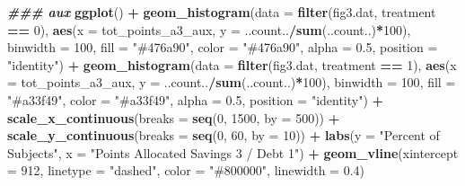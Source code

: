 \documentclass[
]{article}
\newenvironment{Shaded}{\begin{snugshade}}{\end{snugshade}}
\newcommand{\AttributeTok}[1]{\textcolor[rgb]{0.13,0.29,0.53}{#1}}
\newcommand{\DecValTok}[1]{\textcolor[rgb]{0.00,0.00,0.81}{#1}}
\newcommand{\DocumentationTok}[1]{\textcolor[rgb]{0.56,0.35,0.01}{\textbf{\textit{#1}}}}
\newcommand{\FloatTok}[1]{\textcolor[rgb]{0.00,0.00,0.81}{#1}}
\newcommand{\FunctionTok}[1]{\textcolor[rgb]{0.13,0.29,0.53}{\textbf{#1}}}
\newcommand{\NormalTok}[1]{#1}
\newcommand{\SpecialCharTok}[1]{\textcolor[rgb]{0.81,0.36,0.00}{\textbf{#1}}}
\newcommand{\StringTok}[1]{\textcolor[rgb]{0.31,0.60,0.02}{#1}}
\begin{document}
\begin{Shaded}
\begin{Highlighting}[]
\DocumentationTok{\#\#\# aux}
\FunctionTok{ggplot}\NormalTok{() }\SpecialCharTok{+}
  \FunctionTok{geom\_histogram}\NormalTok{(}\AttributeTok{data =} \FunctionTok{filter}\NormalTok{(fig3.dat, treatment }\SpecialCharTok{==} \DecValTok{0}\NormalTok{),}
                 \FunctionTok{aes}\NormalTok{(}\AttributeTok{x =}\NormalTok{ tot\_points\_a3\_aux, }\AttributeTok{y =}\NormalTok{ ..count..}\SpecialCharTok{/}\FunctionTok{sum}\NormalTok{(..count..)}\SpecialCharTok{*}\DecValTok{100}\NormalTok{),}
                 \AttributeTok{binwidth =} \DecValTok{100}\NormalTok{, }\AttributeTok{fill =} \StringTok{"\#476a90"}\NormalTok{, }\AttributeTok{color =} \StringTok{"\#476a90"}\NormalTok{, }\AttributeTok{alpha =} \FloatTok{0.5}\NormalTok{, }\AttributeTok{position =} \StringTok{"identity"}\NormalTok{) }\SpecialCharTok{+}
  \FunctionTok{geom\_histogram}\NormalTok{(}\AttributeTok{data =} \FunctionTok{filter}\NormalTok{(fig3.dat, treatment }\SpecialCharTok{==} \DecValTok{1}\NormalTok{),}
                 \FunctionTok{aes}\NormalTok{(}\AttributeTok{x =}\NormalTok{ tot\_points\_a3\_aux, }\AttributeTok{y =}\NormalTok{ ..count..}\SpecialCharTok{/}\FunctionTok{sum}\NormalTok{(..count..)}\SpecialCharTok{*}\DecValTok{100}\NormalTok{),}
                 \AttributeTok{binwidth =} \DecValTok{100}\NormalTok{, }\AttributeTok{fill =} \StringTok{"\#a33f49"}\NormalTok{, }\AttributeTok{color =} \StringTok{"\#a33f49"}\NormalTok{, }\AttributeTok{alpha =} \FloatTok{0.5}\NormalTok{, }\AttributeTok{position =} \StringTok{"identity"}\NormalTok{) }\SpecialCharTok{+}
  \FunctionTok{scale\_x\_continuous}\NormalTok{(}\AttributeTok{breaks =} \FunctionTok{seq}\NormalTok{(}\DecValTok{0}\NormalTok{, }\DecValTok{1500}\NormalTok{, }\AttributeTok{by =} \DecValTok{500}\NormalTok{)) }\SpecialCharTok{+}
  \FunctionTok{scale\_y\_continuous}\NormalTok{(}\AttributeTok{breaks =} \FunctionTok{seq}\NormalTok{(}\DecValTok{0}\NormalTok{, }\DecValTok{60}\NormalTok{, }\AttributeTok{by =} \DecValTok{10}\NormalTok{)) }\SpecialCharTok{+}
  \FunctionTok{labs}\NormalTok{(}\AttributeTok{y =} \StringTok{"Percent of Subjects"}\NormalTok{, }\AttributeTok{x =} \StringTok{"Points Allocated Savings 3 / Debt 1"}\NormalTok{) }\SpecialCharTok{+}
  \FunctionTok{geom\_vline}\NormalTok{(}\AttributeTok{xintercept =} \DecValTok{912}\NormalTok{, }\AttributeTok{linetype =} \StringTok{"dashed"}\NormalTok{, }\AttributeTok{color =} \StringTok{"\#800000"}\NormalTok{, }\AttributeTok{linewidth =} \FloatTok{0.4}\NormalTok{)}
\end{Highlighting}
\end{Shaded}
\end{document}
